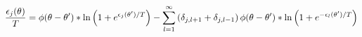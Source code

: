\begin{equation}
    {\epsilon_j(\theta)\over T}=\phi(\theta-\theta')*
    \ln\left(1+e^{\epsilon_j(\theta')/T}\right)-
    \sum_{l=1}^\infty  \left(\delta_{j,l+1}+\delta_{j,l-1}\right)
\phi(\theta-\theta')*
    \ln\left(1+e^{-\epsilon_l(\theta')/T}\right)
\end{equation}

